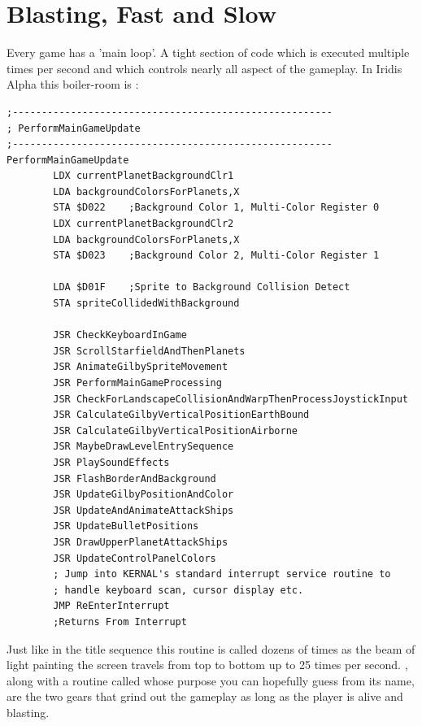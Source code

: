 \chapter{Blasting, Fast and Slow} 
\lstset{style=6502Style}

Every game has a 'main loop'. A tight section of code which is executed multiple times
per second and which controls nearly all aspect of the gameplay. In Iridis Alpha this
boiler-room is :

\begin{lstlisting}[caption=\icode{PerformMainGameUpdate}\, the spaghetti junction handling nearly everything
during main gameplay.]
;-------------------------------------------------------
; PerformMainGameUpdate
;-------------------------------------------------------
PerformMainGameUpdate
        LDX currentPlanetBackgroundClr1
        LDA backgroundColorsForPlanets,X
        STA $D022    ;Background Color 1, Multi-Color Register 0
        LDX currentPlanetBackgroundClr2
        LDA backgroundColorsForPlanets,X
        STA $D023    ;Background Color 2, Multi-Color Register 1

        LDA $D01F    ;Sprite to Background Collision Detect
        STA spriteCollidedWithBackground

        JSR CheckKeyboardInGame
        JSR ScrollStarfieldAndThenPlanets
        JSR AnimateGilbySpriteMovement
        JSR PerformMainGameProcessing
        JSR CheckForLandscapeCollisionAndWarpThenProcessJoystickInput
        JSR CalculateGilbyVerticalPositionEarthBound
        JSR CalculateGilbyVerticalPositionAirborne
        JSR MaybeDrawLevelEntrySequence
        JSR PlaySoundEffects
        JSR FlashBorderAndBackground
        JSR UpdateGilbyPositionAndColor
        JSR UpdateAndAnimateAttackShips
        JSR UpdateBulletPositions
        JSR DrawUpperPlanetAttackShips
        JSR UpdateControlPanelColors
        ; Jump into KERNAL's standard interrupt service routine to 
        ; handle keyboard scan, cursor display etc.
        JMP ReEnterInterrupt 
        ;Returns From Interrupt
\end{lstlisting}

Just like in the title sequence this routine is called dozens of times as the 
beam of light painting the screen travels from top to bottom up to 25 times per second.
, along with a routine called 
whose purpose you can hopefully guess from its name, are the two gears that grind out the
gameplay as long as the player is alive and blasting. 

